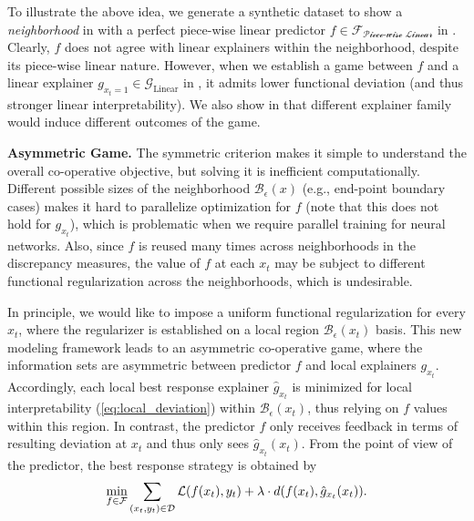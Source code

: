 To illustrate the above idea, we generate a synthetic dataset to show a \emph{neighborhood} in  with a perfect piece-wise linear predictor $f\in \mathcal{F_{\text{Piece-wise Linear}}}$ in . Clearly, $f$ does not agree with linear explainers within the neighborhood, despite its piece-wise linear nature. However, when we establish a game between $f$ and a linear explainer $g_{x_t=1} \in \mathcal{G}_{\text{Linear}}$ in , it admits lower functional deviation (and thus stronger linear interpretability). We also show in  that different explainer family would induce different outcomes of the game.


{\bf Asymmetric Game.}
The symmetric criterion makes it simple to understand the overall co-operative objective, but solving it is inefficient computationally. Different possible sizes of the neighborhood $\mathcal{B}_\epsilon(x)$ (e.g., end-point boundary cases) makes it hard to parallelize optimization for $f$ (note that this does not hold for $g_{x_t}$), which is problematic when we require parallel training for neural networks. Also, since $f$ is reused many times across neighborhoods in the discrepancy measures, the value of $f$ at each $x_t$ may be subject to different functional regularization across the neighborhoods, which is undesirable. 

In principle, we would like to impose a uniform functional regularization for every $x_t$, where the regularizer is established on a local region $\mathcal{B}_\epsilon(x_t)$ basis. This new modeling framework leads to an asymmetric co-operative game, where the information sets are asymmetric between predictor $f$ and local explainers $g_{x_t}$. Accordingly, each local best response explainer $\hat g_{x_t}$ is minimized for local interpretability (\ref{eq:local_deviation}) within $\mathcal{B}_\epsilon(x_t)$, thus relying on $f$ values within this region. In contrast, the predictor $f$ only receives feedback in terms of resulting deviation at $x_t$ and thus only sees $\hat g_{x_t}(x_t)$. From the point of view of the predictor, the best response strategy is obtained by %
\begin{align}
\vspace{-8mm}
\min_{f\in \mathcal{F}}\sum_{(x_t, y_t) \in \mathcal{D}} \mathcal{L}(f(x_t), y_t) + \lambda \cdot d(f(x_t), \hat g_{x_t}(x_t)).
\label{eq:asym_coop_game}
\vspace{-8mm}
\end{align}

